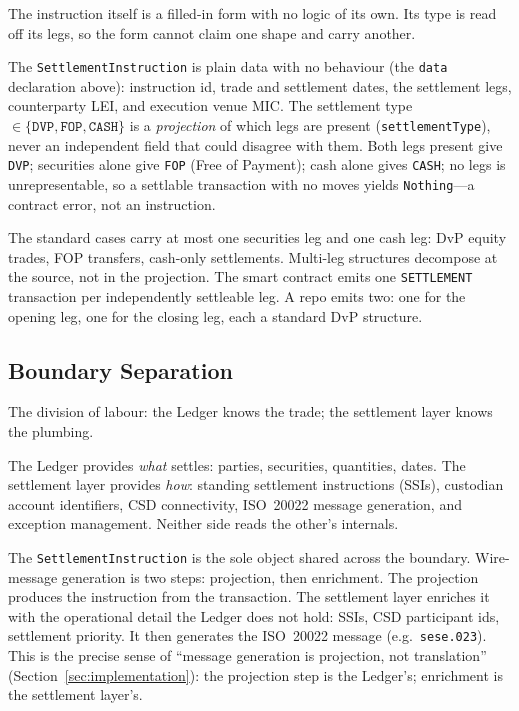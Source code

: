 The instruction itself is a filled-in form with no logic of its own. Its type is read off its legs, so the form cannot claim one shape and carry another.

\begin{definition}[SettlementInstruction]
\label{def:settlement-instruction}
The \texttt{SettlementInstruction} is plain data with no behaviour (the \texttt{data} declaration above): instruction id, trade and settlement dates, the settlement legs, counterparty LEI, and execution venue MIC. The settlement type $\in \{\texttt{DVP}, \texttt{FOP}, \texttt{CASH}\}$ is a \emph{projection} of which legs are present (\texttt{settlementType}), never an independent field that could disagree with them. Both legs present give \texttt{DVP}; securities alone give \texttt{FOP} (Free of Payment); cash alone gives \texttt{CASH}; no legs is unrepresentable, so a settlable transaction with no moves yields \texttt{Nothing}---a contract error, not an instruction.
\end{definition}

The standard cases carry at most one securities leg and one cash leg: DvP equity trades, FOP transfers, cash-only settlements. Multi-leg structures decompose at the source, not in the projection. The smart contract emits one \texttt{SETTLEMENT} transaction per independently settleable leg. A repo emits two: one for the opening leg, one for the closing leg, each a standard DvP structure.

\subsection{Boundary Separation}
\label{sec:settlement-boundary}

The division of labour: the Ledger knows the trade; the settlement layer knows the plumbing.

\begin{principle}
\label{prin:settlement-boundary}
The Ledger provides \emph{what} settles: parties, securities, quantities, dates. The settlement layer provides \emph{how}: standing settlement instructions (SSIs), custodian account identifiers, CSD connectivity, ISO~20022 message generation, and exception management. Neither side reads the other's internals.
\end{principle}

The \texttt{SettlementInstruction} is the sole object shared across the boundary. Wire-message generation is two steps: projection, then enrichment. The projection produces the instruction from the transaction. The settlement layer enriches it with the operational detail the Ledger does not hold: SSIs, CSD participant ids, settlement priority. It then generates the ISO~20022 message (e.g.\ \texttt{sese.023}). This is the precise sense of ``message generation is projection, not translation'' (Section~\ref{sec:implementation}): the projection step is the Ledger's; enrichment is the settlement layer's.

